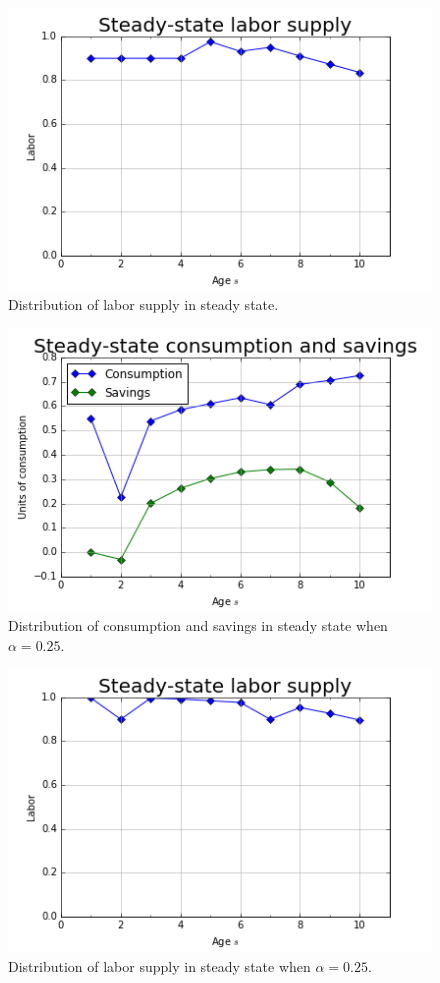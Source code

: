 \documentclass[letterpaper,12pt]{article}
\theoremstyle{definition}
\begin{document}
	\begin{figure}[h!]
	\centering
	\includegraphics[scale=.8]{code/images/SS_n}
	\caption{Distribution of labor supply in steady state.}
	\end{figure}
	
	\begin{figure}[h!]
	\centering
	\includegraphics[scale=.8]{code/images/SS_bc2}
	\caption{Distribution of consumption and savings in steady state when $\alpha = 0.25$.}
	\end{figure}
	
	\begin{figure}[h!]
	\centering
	\includegraphics[scale=.8]{code/images/SS_n2}
	\caption{Distribution of labor supply in steady state when $\alpha = 0.25$.}
	\end{figure}
\end{document}
